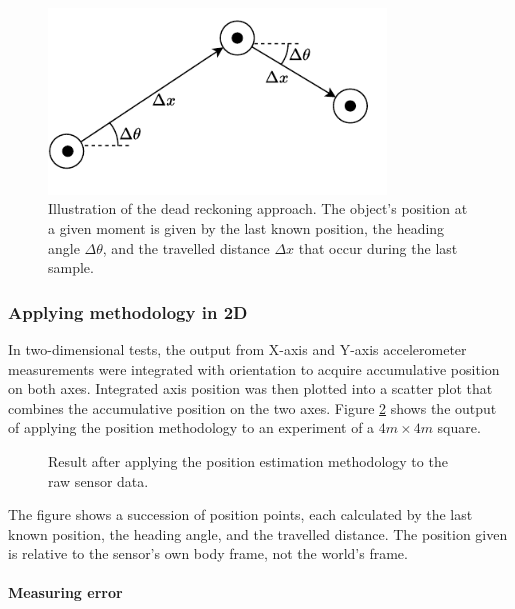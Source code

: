 \begin{figure}[!h]
  \centering
  \includegraphics[width=0.8\textwidth]{figures/dead_reckoning.pdf}
  \caption{Illustration of the dead reckoning approach. The object's position at a given moment is given by the last known position, the heading angle $\Delta \theta$, and the travelled distance $\Delta x$ that occur during the last sample. }
  \label{fig:position}
\end{figure}

\newpage

\subsubsection{Applying methodology in 2D}

In two-dimensional tests, the output from X-axis and Y-axis accelerometer measurements were integrated with orientation to acquire accumulative position on both axes. Integrated axis position was then plotted into a scatter plot that combines the accumulative position on the two axes. Figure \ref{fig:square} shows the output of applying the position methodology to an experiment of a $4m\times 4m$ square.

\begin{figure}[!h]
  \centering
  \resizebox{0.8\linewidth}{!}{}
  \caption{ Result after applying the position estimation methodology to the raw sensor data. }
  \label{fig:square}
\end{figure}

The figure shows a succession of position points, each calculated by the last known position, the heading angle, and the travelled distance. The position given is relative to the sensor's own body frame, not the world's frame.

\paragraph{Measuring error}

